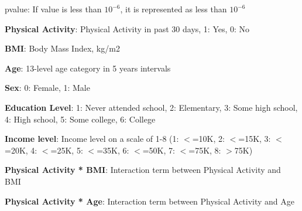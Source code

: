 \documentclass[11pt]{article}
\begin{document}
\begin{table}[h]
\caption{Logistic regression of diabetes status on physical activity, BMI, age, and their interaction terms, adjusting for sex, education, and income}
\label{table:logistic_regression}
\begin{threeparttable}
\renewcommand{\TPTminimum}{\linewidth}
\begin{tablenotes}
\footnotesize
\item pvalue: If value is less than $10^{-6}$, it is represented as less than $10^{-6}$
\item \textbf{Physical Activity}: Physical Activity in past 30 days, 1: Yes, 0: No
\item \textbf{BMI}: Body Mass Index, kg/m2
\item \textbf{Age}: 13-level age category in 5 years intervals
\item \textbf{Sex}: 0: Female, 1: Male
\item \textbf{Education Level}: 1: Never attended school, 2: Elementary, 3: Some high school, 4: High school, 5: Some college, 6: College
\item \textbf{Income level}: Income level on a scale of 1-8 (1: $<$=10K, 2: $<$=15K, 3: $<$=20K, 4: $<$=25K, 5: $<$=35K, 6: $<$=50K, 7: $<$=75K, 8: $>$75K)
\item \textbf{Physical Activity * BMI}: Interaction term between Physical Activity and BMI
\item \textbf{Physical Activity * Age}: Interaction term between Physical Activity and Age
\end{tablenotes}
\end{threeparttable}
\end{table}
\end{document}
